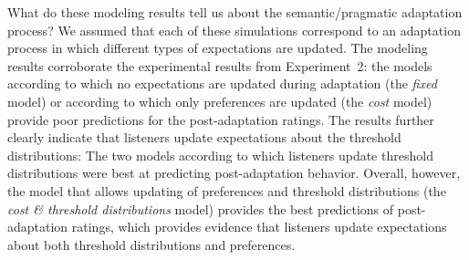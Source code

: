\documentclass[man, floatsintext]{apa6}
\begin{document}
 
 
 

What do these modeling results tell us about the semantic/pragmatic adaptation process? 
We assumed that each of these simulations
correspond to an adaptation process in which different types of expectations are  updated.
The modeling results corroborate the experimental results from Experiment~2:
the models according to which no expectations are updated during adaptation (the \textit{fixed} model) 
or according to which only preferences are updated (the \textit{cost} model) provide poor predictions for the post-adaptation
ratings. The results further clearly indicate that listeners update expectations about the threshold distributions: The two models according to 
which listeners update threshold distributions were best at predicting post-adaptation behavior. Overall, however, the model that allows updating
of preferences and threshold distributions (the \textit{cost \& threshold distributions} model) provides the best predictions of post-adaptation ratings, which
provides evidence that listeners update expectations about both {threshold distributions} and {preferences}. 
\end{document}
